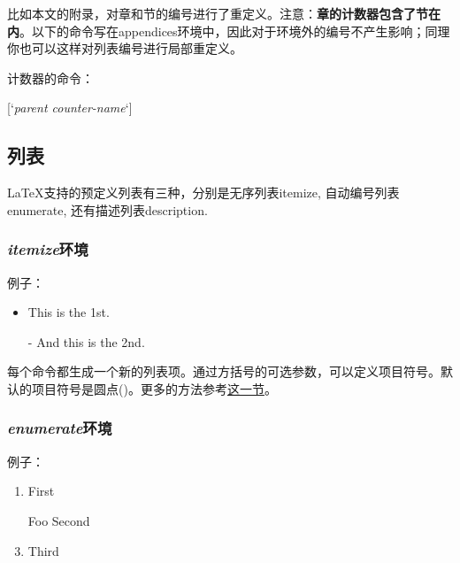 {比如本文的附录，对章和节的编号进行了重定义。注意：\textbf{章的计数器包含了节在内}。以下的命令写在appendices环境中，因此对于环境外的编号不产生影响；同理你也可以这样对列表编号进行局部重定义。
\begin{latex}{}
\renewcommand{\thechapter}{\Alph{chapter}}
\renewcommand{\thesection}
    {\thechapter-\arabic{section}}
\renewcommand{\thefootnote}{[\arabic{footnote}]}
\end{latex}

计数器的命令：
\begin{latex}{}
[`\textit{parent counter-name}`]
\end{latex}

\subsection{列表}
\LaTeX 支持的预定义列表有三种，分别是无序列表itemize, 自动编号列表enumerate, 还有描述列表description.

\subsubsection{\textit{itemize}环境}
例子：

\begin{codeshow}
\begin{itemize}
  \item This is the 1st.
  \item[-] And this is the 2nd.
\end{itemize}
\end{codeshow}

每个\latexline{\\item}命令都生成一个新的列表项。通过方括号的可选参数，可以定义项目符号。默认的项目符号是圆点(\latexline{\\textbullet})。更多的方法参考\hyperref[sec:list]{这一节}。

\subsubsection{\textit{enumerate}环境}
例子：

\begin{codeshow}
\begin{enumerate}
  \item First
  \item[Foo] Second
  \item Third
\end{enumerate}
\end{codeshow}

}
